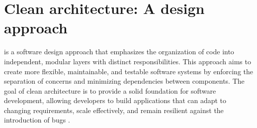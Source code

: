 \section{Clean architecture: A design approach}\label{sec_ca_theory}

\ca is a software design approach that emphasizes the organization of code
into independent, modular layers with distinct responsibilities. This approach aims to
create more flexible, maintainable, and testable software systems by enforcing the
separation of concerns and minimizing dependencies between components. The goal of clean
architecture is to provide a solid foundation for software development, allowing
developers to build applications that can adapt to changing requirements, scale
effectively, and remain resilient against the introduction of bugs
\parencite{robert_c_martin_clean_2018}.









